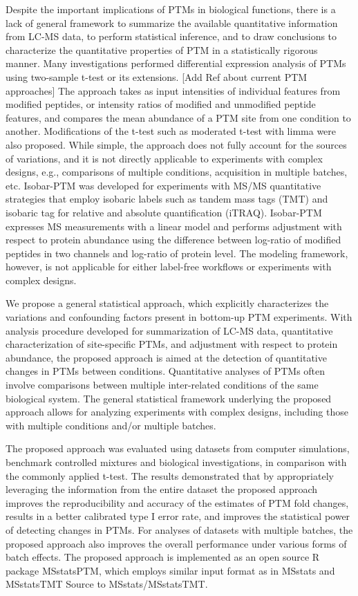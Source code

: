 \documentclass[mcp]{article}
\numberwithin{figure}{section} %
\numberwithin{table}{section}
\def\todo#1{{\color{red}[#1]}}
\begin{document}
Despite the important implications of PTMs in biological functions, there is a lack of general framework to summarize the available quantitative information from LC-MS data, to perform statistical inference, and to draw conclusions to characterize the quantitative properties of PTM in a statistically rigorous manner. Many investigations performed differential expression analysis of PTMs using two-sample t-test or its extensions. \todo{Add Ref about current PTM approaches} The approach takes as input intensities of individual features from modified peptides, or intensity ratios of modified and unmodified peptide features, and compares the mean abundance of a PTM site from one condition to another. Modifications of the t-test such as moderated t-test with limma were also proposed. While simple, the approach does not fully account for the sources of variations, and it is not directly applicable to experiments with complex designs, e.g., comparisons of multiple conditions, acquisition in multiple batches, etc. Isobar-PTM was developed for experiments with MS/MS quantitative strategies that employ isobaric labels such as tandem mass tags (TMT) and isobaric tag for relative and absolute quantification (iTRAQ).\cite{Breitwieser:2013} Isobar-PTM expresses MS measurements with a linear model and performs adjustment with respect to protein abundance using the difference between log-ratio of modified peptides in two channels and log-ratio of protein level. The modeling framework, however, is not applicable for either label-free workflows or experiments with complex designs.

We propose a general statistical approach, which explicitly characterizes the variations and confounding factors present in bottom-up PTM experiments. With analysis procedure developed for summarization of LC-MS data, quantitative characterization of site-specific PTMs, and adjustment with respect to protein abundance, the proposed approach is aimed at the detection of quantitative changes in PTMs between conditions. Quantitative analyses of PTMs often involve comparisons between multiple inter-related conditions of the same biological system. The general statistical framework underlying the proposed approach allows for analyzing experiments with complex designs, including those with multiple conditions and/or multiple batches. 

The proposed approach was evaluated using datasets from computer simulations, benchmark controlled mixtures and biological investigations, in comparison with the commonly applied t-test. The results demonstrated that by appropriately leveraging the information from the entire dataset the proposed approach improves the reproducibility and accuracy of the estimates of PTM fold changes, results in a better calibrated type I error rate, and improves the statistical power of detecting changes in PTMs. For analyses of datasets with multiple batches, the proposed approach also improves the overall performance under various forms of batch effects. The proposed approach is implemented as an open source R package MSstatsPTM, which employs similar input format as in MSstats and MSstatsTMT {Source to MSstats/MSstatsTMT}.
\end{document}
